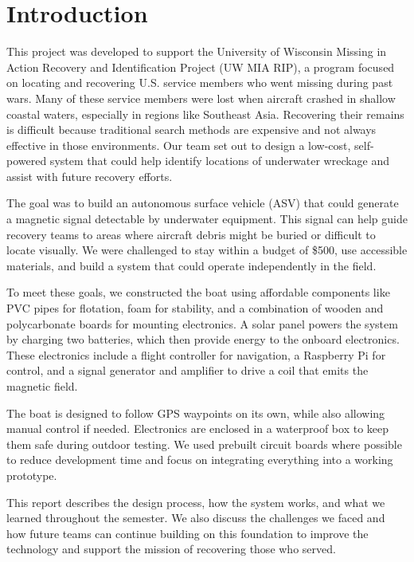 \section{Introduction}

This project was developed to support the University of Wisconsin Missing in Action Recovery and Identification Project (UW MIA RIP), a program focused on locating and recovering U.S. service members who went missing during past wars. Many of these service members were lost when aircraft crashed in shallow coastal waters, especially in regions like Southeast Asia. Recovering their remains is difficult because traditional search methods are expensive and not always effective in those environments. Our team set out to design a low-cost, self-powered system that could help identify locations of underwater wreckage and assist with future recovery efforts.

The goal was to build an autonomous surface vehicle (ASV) that could generate a magnetic signal detectable by underwater equipment. This signal can help guide recovery teams to areas where aircraft debris might be buried or difficult to locate visually. We were challenged to stay within a budget of \$500, use accessible materials, and build a system that could operate independently in the field.

To meet these goals, we constructed the boat using affordable components like PVC pipes for flotation, foam for stability, and a combination of wooden and polycarbonate boards for mounting electronics. A solar panel powers the system by charging two batteries, which then provide energy to the onboard electronics. These electronics include a flight controller for navigation, a Raspberry Pi for control, and a signal generator and amplifier to drive a coil that emits the magnetic field.

The boat is designed to follow GPS waypoints on its own, while also allowing manual control if needed. Electronics are enclosed in a waterproof box to keep them safe during outdoor testing. We used prebuilt circuit boards where possible to reduce development time and focus on integrating everything into a working prototype.

This report describes the design process, how the system works, and what we learned throughout the semester. We also discuss the challenges we faced and how future teams can continue building on this foundation to improve the technology and support the mission of recovering those who served.
